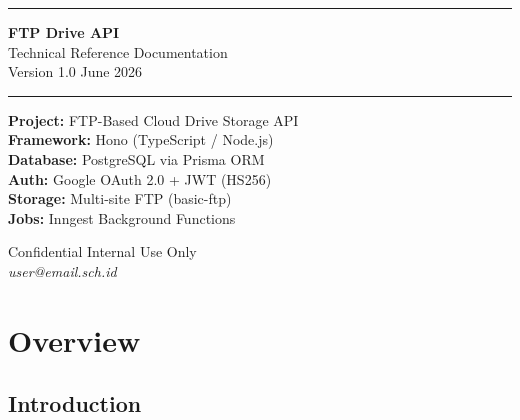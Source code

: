\documentclass[12pt,a4paper]{article}
\begin{document}
\begin{titlepage}
  \centering
  \vspace*{2cm}

  {\color{primary}\rule{\linewidth}{2pt}}
  \vspace{0.5cm}

  {\Huge\bfseries\color{secondary} FTP Drive API}\\[0.4cm]
  {\Large\color{muted} Technical Reference Documentation}\\[0.2cm]
  {\normalsize\color{muted} Version 1.0 \textemdash{} June 2026}

  \vspace{0.5cm}
  {\color{primary}\rule{\linewidth}{2pt}}

  \vspace{2cm}

  \begin{tcolorbox}[colback=primary!5,colframe=primary,width=0.85\linewidth]
    \centering
    \textbf{Project:} FTP-Based Cloud Drive Storage API\\
    \textbf{Framework:} Hono (TypeScript / Node.js)\\
    \textbf{Database:} PostgreSQL via Prisma ORM\\
    \textbf{Auth:} Google OAuth 2.0 + JWT (HS256)\\
    \textbf{Storage:} Multi-site FTP (basic-ftp)\\
    \textbf{Jobs:} Inngest Background Functions
  \end{tcolorbox}

  \vfill

  {\small\color{muted}
    Confidential \textemdash{} Internal Use Only\\
    \textit{user@email.sch.id}
  }
\end{titlepage}

\tableofcontents
\newpage

\section{Overview}

\subsection{Introduction}
\end{document}
